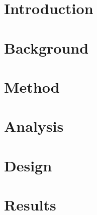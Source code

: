 



\frontmatter{}

%



\pagebreak

\setcounter{tocdepth}{2}
\tableofcontents*


\mainmatter{}


%

\chapter{Introduction}\label{intro}


\chapter{Background}\label{background}


\chapter{Method}\label{method}


\chapter{Analysis}\label{analysis}


\chapter{Design}\label{design}


\chapter{Results}\label{results}


